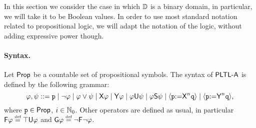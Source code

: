 In this section we consider the case in which $\mathbb{D}$ is a binary domain, in particular, we will take it to be Boolean values. In order to use most standard notation related to propositional logic, we will adapt the notation of the logic, without adding expressive power though. 

\paragraph{Syntax.} Let ${\rm \sf Prop}$ be a countable set of propositional symbols. The syntax of ${\rm\textsf{PLTL-A}}$ is defined by the following grammar:
\[
    \varphi,\psi ::= \mathtt{p} \mid \neg\varphi \mid \varphi \vee \psi \mid {\operatorname{\sf X}}\varphi \mid {\operatorname{\sf Y}}\varphi \mid \varphi {\operatorname{\sf U}} \psi \mid \varphi{\operatorname{\sf S}}\psi \mid {\langle{\mathtt{p}{:=}{\operatorname{\sf X}}^n\mathtt{q}}\rangle} \mid {\langle{\mathtt{p}{:=}{\operatorname{\sf Y}}^n\mathtt{q}}\rangle},
\]
where $\mathtt{p}\in{\rm \sf Prop}$, $i\in\mathbb{N}_0$. Other operators are defined as usual, in particular $\Eventually\aformula \egdef \top\Until\aformula$ and $\Always\aformula \egdef \neg\Eventually\neg\aformula$.


